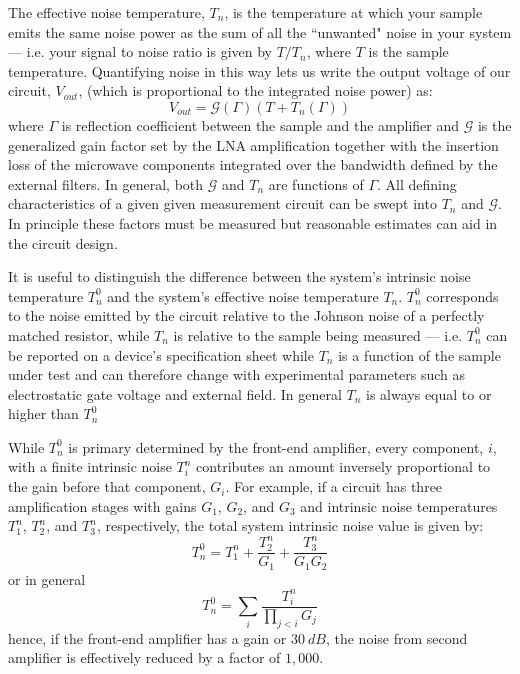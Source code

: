 The effective noise temperature, $T_n$, is the temperature at which your sample emits the same noise power as the sum of all the ``unwanted" noise in your system --- i.e. your signal to noise ratio is given by $T/T_n$, where $T$ is the sample temperature. Quantifying noise in this way lets us write the output voltage of our circuit, $V_{out}$, (which is proportional to the integrated noise power) as:
\begin{equation}\label{eq:power_output}
V_{out} = \mathcal{G}(\Gamma)(T+T_n(\Gamma))
\end{equation}
where $\Gamma$ is reflection coefficient between the sample and the amplifier and $\mathcal{G}$ is the generalized gain factor set by the LNA amplification together with the insertion loss of the microwave components integrated over the bandwidth defined by the external filters. In general, both $\mathcal{G}$ and $T_n$ are functions of $\Gamma$. All defining characteristics of a given given measurement circuit can be swept into $T_n$ and $\mathcal{G}$. In principle these factors must be measured but reasonable estimates can aid in the circuit design.

It is useful to distinguish the difference between the system's intrinsic noise temperature $T_n^0$ and the system's effective noise temperature $T_n$. $T_n^0$ corresponds to the noise emitted by the circuit relative to the Johnson noise of a perfectly matched resistor, while $T_n$ is relative to the sample being measured --- i.e. $T_n^0$ can be reported on a device's specification sheet while $T_n$ is a function of the sample under test and can therefore change with experimental parameters such as electrostatic gate voltage and external field. In general $T_n$ is always equal to or higher than $T_n^0$

While $T_n^0$ is primary determined by the front-end amplifier, every component, $i$, with a finite intrinsic noise $T_i^n$ contributes an amount inversely proportional to the gain before that component, $G_i$. For example, if a circuit has three amplification stages with gains $G_1$, $G_2$, and $G_3$ and intrinsic noise temperatures $T_1^n$, $T_2^n$, and $T_3^n$, respectively, the total system intrinsic noise value is given by:
\begin{equation}
T_n^0 = T_1^n+\frac{T_2^n}{G_1}+\frac{T_3^n}{G_1G_2}
\end{equation}
or in general
\begin{equation}
T_n^0 = \sum_{i}\frac{T_i^n}{\prod_{j<i}G_j}
\end{equation}
hence, if the front-end amplifier has a gain or $30~dB$, the noise from second amplifier is effectively reduced by a factor of $1,000$.

